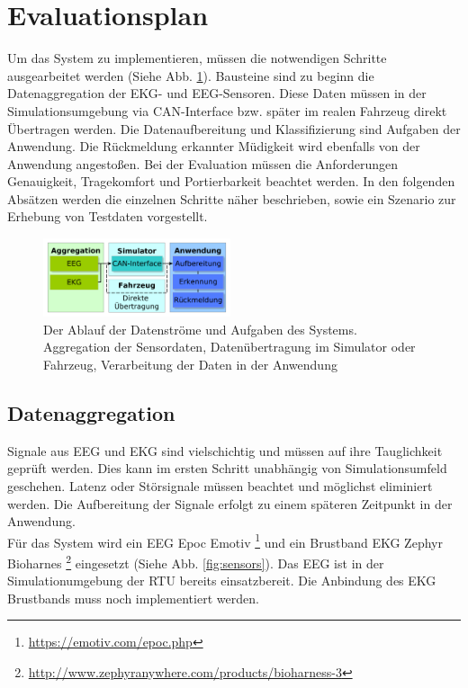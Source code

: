 {\section{Evaluationsplan}
\label{chap:eval}
Um das System zu implementieren, müssen die notwendigen Schritte ausgearbeitet werden (Siehe Abb. \ref{fig:block}). Bausteine sind zu beginn die Datenaggregation der EKG- und EEG-Sensoren. Diese Daten müssen in der Simulationsumgebung via CAN-Interface bzw. später im realen Fahrzeug direkt Übertragen werden. Die Datenaufbereitung und Klassifizierung sind Aufgaben der Anwendung. Die Rückmeldung erkannter Müdigkeit wird ebenfalls von der Anwendung angestoßen. 
Bei der Evaluation müssen die Anforderungen Genauigkeit, Tragekomfort und Portierbarkeit beachtet werden. In den folgenden Absätzen werden die einzelnen Schritte näher beschrieben, sowie ein Szenario zur Erhebung von Testdaten vorgestellt.

\begin{figure}[h] 
  \begin{center}
    \includegraphics[width=5.5cm]{img/block}
    \caption{Der Ablauf der Datenströme und Aufgaben des Systems. Aggregation der Sensordaten, Datenübertragung im Simulator oder Fahrzeug, Verarbeitung der Daten in der Anwendung}
    \label{fig:block}
  \end{center}
\end{figure}

\subsection{Datenaggregation}
Signale aus EEG und EKG sind vielschichtig und müssen auf ihre Tauglichkeit geprüft werden. Dies kann im ersten Schritt unabhängig von Simulationsumfeld geschehen. Latenz oder Störsignale müssen beachtet und möglichst eliminiert werden. Die Aufbereitung der Signale erfolgt zu einem späteren Zeitpunkt in der Anwendung. \\

Für das System wird ein EEG Epoc Emotiv \footnote{\url{https://emotiv.com/epoc.php}} und ein Brustband EKG Zephyr Bioharnes \footnote{\url{http://www.zephyranywhere.com/products/bioharness-3}} eingesetzt (Siehe Abb. \ref{fig:sensors}). Das EEG ist in der Simulationumgebung der \acl{RTU} bereits einsatzbereit. Die Anbindung des EKG Brustbands muss noch implementiert werden.

}
